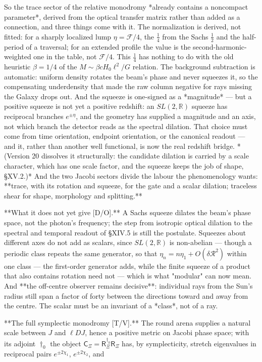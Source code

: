 So the trace sector of the relative monodromy *already contains a noncompact parameter*, derived from the optical transfer matrix rather than added as a connection, and three things come with it. The normalization is derived, not fitted: for a sharply localized lump $\eta = \mathcal F/4$, the $\tfrac14$ from the Sachs $\tfrac12$ and the half-period of a traversal; for an extended profile the value is the second-harmonic-weighted one in the table, not $\mathcal F/4$. This $\tfrac14$ has nothing to do with the old heuristic $\beta = 1/4$ of the $M\sim\beta cH_0\ell^2/G$ relation. The background subtraction is automatic: uniform density rotates the beam's phase and never squeezes it, so the compensating underdensity that made the raw column negative for rays missing the Galaxy drops out. And the squeeze is one-signed as a *magnitude* — but a positive squeeze is not yet a positive redshift: an $SL(2,\mathbb R)$ squeeze has reciprocal branches $e^{\pm\eta}$, and the geometry has supplied a magnitude and an axis, not which branch the detector reads as the spectral dilation. That choice must come from time orientation, endpoint orientation, or the canonical readout — and it, rather than another well functional, is now the real redshift bridge. *(Version 20 dissolves it structurally: the candidate dilation is carried by a scale character, which has one scale factor, and the squeeze keeps the job of shape, §XV.2.)* And the two Jacobi sectors divide the labour the phenomenology wants: **trace, with its rotation and squeeze, for the gate and a scalar dilation; traceless shear for shape, morphology and splitting.**

**What it does not yet give [D/O].** A Sachs squeeze dilates the beam's phase space, not the photon's frequency; the step from isotropic optical dilation to the spectral and temporal readout of §XIV.5 is still the postulate. Squeezes about different axes do not add as scalars, since $SL(2,\mathbb R)$ is non-abelian — though a periodic class repeats the same generator, so that $\eta_n = n\eta_1+O(\delta\mathcal R^2)$ within one class — the first-order generator adds, while the finite squeeze of a product that also contains rotation need not — which is what "modular" can now mean. And **the off-centre observer remains decisive**: individual rays from the Sun's radius still span a factor of forty between the directions toward and away from the centre. The scalar must be an invariant of a *class*, not of a ray.

**The full symplectic monodromy [T/V].** The round arena supplies a natural scale between $J$ and $\ell DJ$, hence a positive metric on Jacobi phase space; with its adjoint $\dagger_0$ the object $\mathsf C_\Xi = \mathsf R_\Xi^{\dagger_0}\mathsf R_\Xi$ has, by symplecticity, stretch eigenvalues in reciprocal pairs $e^{\pm2\chi_1}$, $e^{\pm2\chi_2}$, and

